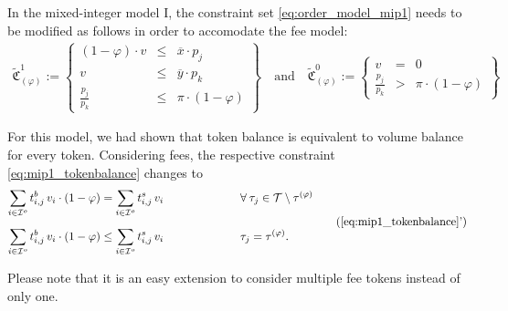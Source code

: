 \documentclass[11pt,parskip=full]{scrartcl}%
\newcommand*{\tokens}{\mathcal{T}}          %
\newcommand*{\iorders}{\mathcal{I}^o}       %
\begin{document}
In the mixed-integer model I, the constraint set \eqref{eq:order_model_mip1} needs to be modified as follows in order to accomodate the fee model:
\begin{align}
  \tilde{\mathfrak{C}}^1_{(\varphi)} := \left\{
  \begin{array}{rlll}
    (1-\varphi) \cdot v &\le & \overline{x} \cdot p_j \\
    v &\le & \overline{y} \cdot p_k \\[1mm]
    \frac{p_j}{p_k} &\le & \pi \cdot (1-\varphi)
  \end{array}
  \right\}
  \quad
  \text{and}
  \quad
  \tilde{\mathfrak{C}}^0_{(\varphi)} := \left\{
  \begin{array}{rll}
    v &= & 0 \\[1mm]
    \frac{p_j}{p_k} &> & \pi \cdot (1-\varphi)
  \end{array}
  \right\}
  \label{eq:order_model_mip1_fee}
\end{align}

For this model, we had shown that token balance is equivalent to volume balance for every token.
Considering fees, the respective constraint \eqref{eq:mip1_tokenbalance} changes to
\begin{equation}
  \begin{aligned}
    \sum\limits_{i \in \iorders} t^b_{i,j} \, v_i \cdot (1-\varphi)
    &= \sum\limits_{i \in \iorders} t^s_{i,j} \, v_i
    &&\hspace{2cm} \forall \> \tau_j \in \tokens \setminus \tau^{(\varphi)} \\[2mm]
    \sum\limits_{i \in \iorders} t^b_{i,j} \, v_i \cdot (1-\varphi)
    &\le \sum\limits_{i \in \iorders} t^s_{i,j} \, v_i
    &&\hspace{2cm} \tau_j = \tau^{(\varphi)}.
  \end{aligned}
  \tag{\ref{eq:mip1_tokenbalance}'}
\end{equation}

Please note that it is an easy extension to consider multiple fee tokens instead of only one.
\end{document}
